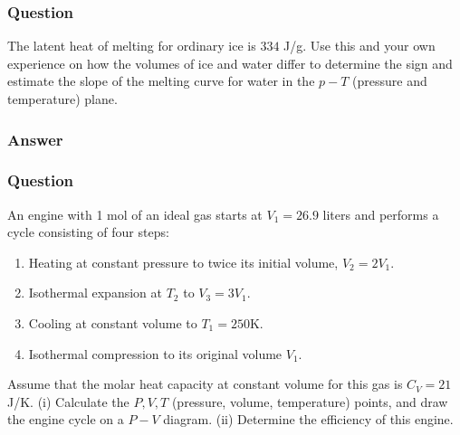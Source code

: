 \subsubsection{Question}
The latent heat of melting for ordinary ice is $334$ J/g. Use this and your own experience on how the volumes of ice and water differ to determine the sign and estimate the slope of the melting curve for water in the $p-T$ (pressure and temperature) plane.
\subsubsection{Answer}



\subsubsection{Question}
An engine with 1 mol of an ideal gas starts at $V_1 = 26.9$ liters and performs a cycle consisting of four steps:
\begin{enumerate}
	\item Heating at constant pressure to twice its initial volume, $V_2 = 2 V_1$.
	\item Isothermal expansion at $T_2$ to $V_3 = 3 V_1$.
	\item Cooling at constant volume to $T_1=250$K.
	\item Isothermal compression to its original volume $V_1$.
\end{enumerate}Assume that the molar heat capacity at constant volume for this gas is $C_V = 21$ J/K. (i) Calculate the $P, V, T$ (pressure, volume, temperature) points, and draw the engine cycle on a $P-V$ diagram. (ii) Determine the efficiency of this engine.


